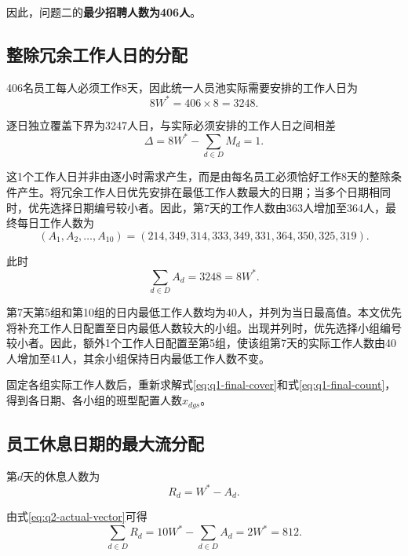 \documentclass[withoutpreface,bwprint]{cumcmthesis}
\begin{document}
因此，问题二的\textbf{最少招聘人数为406人}。

\subsection{整除冗余工作人日的分配}

406名员工每人必须工作8天，因此统一人员池实际需要安排的工作人日为
\begin{equation}
8W^*=406\times8=3248.
\label{eq:q2-required-workdays}
\end{equation}

逐日独立覆盖下界为3247人日，与实际必须安排的工作人日之间相差
\begin{equation}
\Delta
=
8W^*-\sum_{d\in D}M_d
=
1.
\label{eq:q2-redundancy}
\end{equation}

这1个工作人日并非由逐小时需求产生，而是由每名员工必须恰好工作8天的整除条件产生。将冗余工作人日优先安排在最低工作人数最大的日期；当多个日期相同时，优先选择日期编号较小者。因此，第7天的工作人数由363人增加至364人，最终每日工作人数为
\begin{equation}
(A_1,A_2,\ldots,A_{10})
=
(214,349,314,333,349,331,364,350,325,319).
\label{eq:q2-actual-vector}
\end{equation}

此时
\[
\sum_{d\in D}A_d=3248=8W^*.
\]

第7天第5组和第10组的日内最低工作人数均为40人，并列为当日最高值。本文优先将补充工作人日配置至日内最低人数较大的小组。出现并列时，优先选择小组编号较小者。因此，额外1个工作人日配置至第5组，使该组第7天的实际工作人数由40人增加至41人，其余小组保持日内最低工作人数不变。

固定各组实际工作人数后，重新求解式\eqref{eq:q1-final-cover}和式\eqref{eq:q1-final-count}，得到各日期、各小组的班型配置人数$x_{dgs}$。

\subsection{员工休息日期的最大流分配}

第$d$天的休息人数为
\begin{equation}
R_d=W^*-A_d.
\label{eq:q2-rest-number}
\end{equation}

由式\eqref{eq:q2-actual-vector}可得
\begin{equation}
\sum_{d\in D}R_d
=
10W^*-\sum_{d\in D}A_d
=
2W^*
=
812.
\label{eq:q2-rest-total}
\end{equation}
\end{document}
